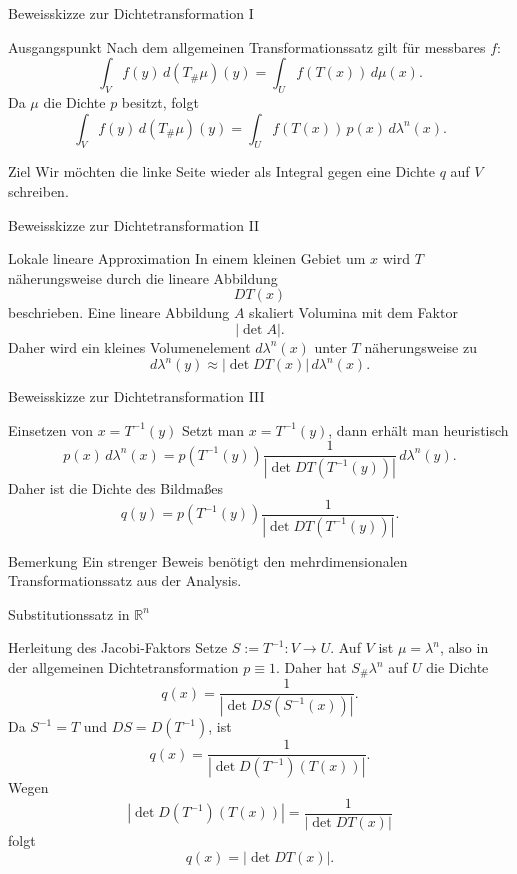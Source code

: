 \documentclass{beamer}
\begin{document}
\begin{frame}{Beweisskizze zur Dichtetransformation I}
\begin{block}{Ausgangspunkt}
Nach dem allgemeinen Transformationssatz gilt für messbares \(f\):
\[
\int_V f(y)\,d(T_\#\mu)(y)
=
\int_U f(T(x))\,d\mu(x).
\]
Da \(\mu\) die Dichte \(p\) besitzt, folgt
\[
\int_V f(y)\,d(T_\#\mu)(y)
=
\int_U f(T(x))\,p(x)\,d\lambda^n(x).
\]
\end{block}

\begin{block}{Ziel}
Wir möchten die linke Seite wieder als Integral gegen eine Dichte \(q\) auf \(V\) schreiben.
\end{block}
\end{frame}

\begin{frame}{Beweisskizze zur Dichtetransformation II}
\begin{block}{Lokale lineare Approximation}
In einem kleinen Gebiet um \(x\) wird \(T\) näherungsweise durch die lineare Abbildung
\[
DT(x)
\]
beschrieben.
Eine lineare Abbildung \(A\) skaliert Volumina mit dem Faktor
\[
|\det A|.
\]
Daher wird ein kleines Volumenelement \(d\lambda^n(x)\) unter \(T\) näherungsweise zu
\[
d\lambda^n(y)\approx |\det DT(x)|\,d\lambda^n(x).
\]
\end{block}
\end{frame}

\begin{frame}{Beweisskizze zur Dichtetransformation III}
\begin{block}{Einsetzen von \(x=T^{-1}(y)\)}
Setzt man \(x=T^{-1}(y)\), dann erhält man heuristisch
\[
p(x)\,d\lambda^n(x)
=
p(T^{-1}(y))
\frac{1}{|\det DT(T^{-1}(y))|}\,d\lambda^n(y).
\]
Daher ist die Dichte des Bildmaßes
\[
q(y)=p(T^{-1}(y))
\frac{1}{|\det DT(T^{-1}(y))|}.
\]
\end{block}

\begin{block}{Bemerkung}
Ein strenger Beweis benötigt den mehrdimensionalen Transformationssatz aus der Analysis.
\end{block}
\end{frame}

\begin{frame}{Substitutionssatz in \(\mathbb R^n\)}
\begin{block}{Herleitung des Jacobi-Faktors}
Setze \(S:=T^{-1}\colon V\to U\). Auf \(V\) ist \(\mu=\lambda^n\), also in der
allgemeinen Dichtetransformation \(p\equiv 1\). Daher hat \(S_\#\lambda^n\) auf \(U\)
die Dichte
\[
q(x)=\frac{1}{|\det DS(S^{-1}(x))|}.
\]
Da \(S^{-1}=T\) und \(DS=D(T^{-1})\), ist
\[
q(x)=\frac{1}{|\det D(T^{-1})(T(x))|}.
\]
Wegen
\[
\left|\det D(T^{-1})(T(x))\right|=\frac{1}{|\det DT(x)|}
\]
folgt
\[
q(x)=|\det DT(x)|.
\]
\end{block}
\end{frame}
\end{document}
